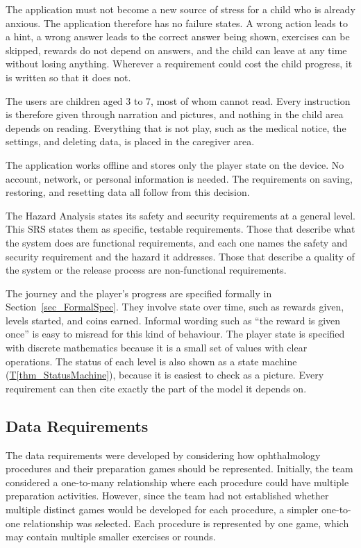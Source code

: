 \documentclass[10pt]{article}
\newcommand{\thmref}[1]{\hyperref[#1]{T\ref*{#1}}}
\begin{document}
The application must not become a new source of stress for a child who is
already anxious. The application therefore has no failure states. A wrong
action leads to a hint, a wrong answer leads to the correct answer being
shown, exercises can be skipped, rewards do not depend on answers, and
the child can leave at any time without losing anything. Wherever a
requirement could cost the child progress, it is written so that it does not.

The users are children aged 3 to 7, most of whom cannot read. Every
instruction is therefore given through narration and pictures, and nothing in
the child area depends on reading. Everything that is not play, such as the
medical notice, the settings, and deleting data, is placed in the caregiver
area.

The application works offline and stores only the player state on the device.
No account, network, or personal information is needed. The requirements on
saving, restoring, and resetting data all follow from this decision.

The Hazard Analysis states its safety and security requirements at a general
level. This SRS states them as specific, testable requirements. Those that
describe what the system does are functional requirements, and each one names
the safety and security requirement and the hazard it addresses. Those that
describe a quality of the system or the release process are non-functional
requirements.

The journey and the player's progress are specified formally in
Section~\ref{sec_FormalSpec}. They involve state over time, such as rewards
given, levels started, and coins earned. Informal wording such as ``the reward
is given once'' is easy to misread for this kind of behaviour. The player
state is specified with discrete mathematics because it is a small set of
values with clear operations. The status of each level is also shown as a
state machine (\thmref{thm_StatusMachine}), because it is easiest to check as
a picture. Every requirement can then cite exactly the part of the model it
depends on.

\subsection{Data Requirements}

The data requirements were developed by considering how
ophthalmology procedures and their preparation games should
be represented. Initially, the team considered a one-to-many relationship where each procedure could have multiple
preparation activities. However, since the team had not established
whether multiple distinct games would be developed for
each procedure, a simpler one-to-one relationship was selected.
Each procedure is represented by one game, which may contain
multiple smaller exercises or rounds.
\end{document}
